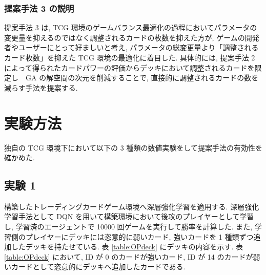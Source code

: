 \documentclass[12pt]{jarticle}
\begin{document}
\subsubsection{提案手法 3 の説明}
提案手法 3 は, TCG 環境のゲームバランス最適化の過程においてパラメータの変更量を抑えるのではなく調整されるカードの枚数を抑えた方が, ゲームの開発者やユーザーにとって好ましいと考え, パラメータの総変更量より「調整されるカード枚数」を抑えた TCG 環境の最適化に着目した.
 具体的には, 提案手法 2 によって得られたカードパワーの評価からデッキにおいて調整されるカードを限定し　GA の解空間の次元を削減することで, 直接的に調整されるカードの数を減らす手法を提案する.

\clearpage
\section{実験方法}
独自の TCG 環境下において以下の 3 種類の数値実験をして提案手法の有効性を確かめた.
\subsection{実験 1}
構築したトレーディングカードゲーム環境へ深層強化学習を適用する. 
深層強化学習手法として DQN を用いて構築環境において後攻のプレイヤーとして学習し, 学習済のエージェントで 10000 回ゲームを実行して勝率を計算した. また, 学習側のプレイヤーにデッキには恣意的に弱いカード, 強いカードを 1 種類ずつ追加したデッキを持たせている. 表 \ref{table:OPdeck} にデッキの内容を示す. 表 \ref{table:OPdeck} において, ID が 0 のカードが強いカード, ID が 14 のカードが弱いカードとして恣意的にデッキへ追加したカードである.
\end{document}
